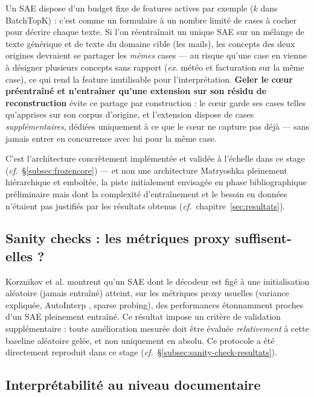 \documentclass[11pt]{article}
\begin{document}
\begin{definitionbox}
Un SAE dispose d'un budget fixe de features actives par exemple ($k$ dans
BatchTopK) : c'est comme un formulaire à un nombre limité de cases à cocher
pour décrire chaque texte. Si l'on réentraînait un unique SAE sur un mélange
de texte générique et de texte du domaine cible (les mails), les concepts
des deux origines devraient se partager les \emph{mêmes} cases --- au risque
qu'une case en vienne à désigner plusieurs concepts sans rapport (\emph{ex.}
\og{}météo\fg{} et \og{}facturation\fg{} sur la même case), ce qui rend la
feature inutilisable pour l'interprétation. \textbf{Geler le cœur
préentraîné et n'entraîner qu'une extension sur son résidu de reconstruction}
évite ce partage par construction : le cœur garde ses cases telles
qu'apprises sur son corpus d'origine, et l'extension dispose de cases
\emph{supplémentaires}, dédiées uniquement à ce que le cœur ne capture pas
déjà --- sans jamais entrer en concurrence avec lui pour la même case.
\end{definitionbox}

C'est l'architecture concrètement implémentée et
validée à l'échelle dans ce stage (\emph{cf.}~\S\ref{subsec:frozencore}) ---
et non une architecture Matryoshka pleinement hiérarchique et emboîtée, la
piste initialement envisagée en phase bibliographique préliminaire mais dont
la complexité d'entraînement et le besoin en données n'étaient pas justifiés
par les résultats obtenus (\emph{cf.}~chapitre~\ref{sec:resultats}).

\subsection{Sanity checks : les métriques proxy suffisent-elles ?}

Korznikov et al. \cite{korznikov2025sanitychecks} montrent qu'un SAE dont le
décodeur est figé à une initialisation aléatoire (jamais entraîné) atteint,
sur les métriques proxy usuelles (variance expliquée, AutoInterp
\cite{bills2023language}, sparse probing), des performances étonnamment
proches d'un SAE pleinement entraîné.
Ce résultat impose un critère de validation supplémentaire : toute
amélioration mesurée doit être évaluée \emph{relativement} à cette baseline
aléatoire gelée, et non uniquement en absolu. Ce protocole a été directement
reproduit dans ce stage (\emph{cf.}~\S\ref{subsec:sanity-check-resultats}).

\subsection{Interprétabilité au niveau documentaire}
\end{document}
